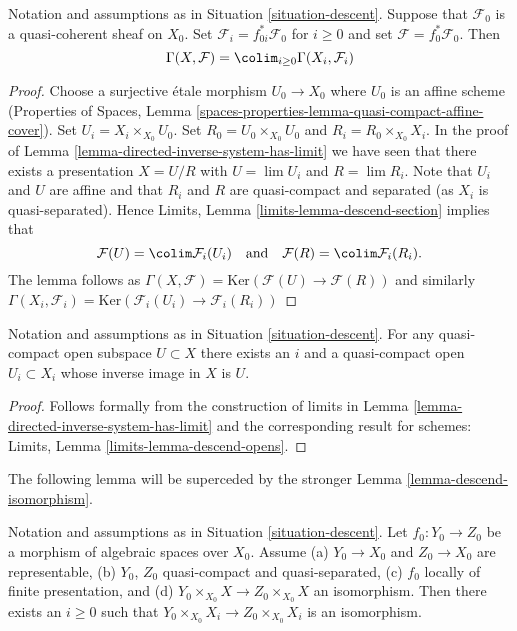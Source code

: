 \begin{lemma}
\label{lemma-descend-section}
Notation and assumptions as in Situation \ref{situation-descent}.
Suppose that $\mathcal{F}_0$ is a quasi-coherent sheaf on $X_0$.
Set $\mathcal{F}_i = f_{0i}^*\mathcal{F}_0$ for $i \geq 0$ and set
$\mathcal{F} = f_0^*\mathcal{F}_0$. Then
$$
\Gamma(X, \mathcal{F}) = \colim_{i \geq 0} \Gamma(X_i, \mathcal{F}_i)
$$
\end{lemma}

\begin{proof}
Choose a surjective \'etale morphism $U_0 \to X_0$ where $U_0$ is an affine
scheme (Properties of Spaces, Lemma
\ref{spaces-properties-lemma-quasi-compact-affine-cover}).
Set $U_i = X_i \times_{X_0} U_0$.
Set $R_0 = U_0 \times_{X_0} U_0$ and $R_i = R_0 \times_{X_0} X_i$.
In the proof of Lemma \ref{lemma-directed-inverse-system-has-limit} we have
seen that there exists a presentation $X = U/R$ with
$U = \lim U_i$ and $R = \lim R_i$.
Note that $U_i$ and $U$ are affine and that $R_i$ and $R$ are
quasi-compact and separated (as $X_i$ is quasi-separated). Hence
Limits, Lemma \ref{limits-lemma-descend-section}
implies that
$$
\mathcal{F}(U) = \colim \mathcal{F}_i(U_i)
\quad\text{and}\quad
\mathcal{F}(R) = \colim \mathcal{F}_i(R_i).
$$
The lemma follows as
$\Gamma(X, \mathcal{F}) = \text{Ker}(\mathcal{F}(U) \to \mathcal{F}(R))$
and similarly
$\Gamma(X_i, \mathcal{F}_i) =
\text{Ker}(\mathcal{F}_i(U_i) \to \mathcal{F}_i(R_i))$
\end{proof}

\begin{lemma}
\label{lemma-descend-opens}
Notation and assumptions as in Situation \ref{situation-descent}.
For any quasi-compact open subspace $U \subset X$ there exists an $i$
and a quasi-compact open $U_i \subset X_i$ whose inverse image in $X$ is $U$.
\end{lemma}

\begin{proof}
Follows formally from the construction of limits in
Lemma \ref{lemma-directed-inverse-system-has-limit}
and the corresponding result for schemes:
Limits, Lemma \ref{limits-lemma-descend-opens}.
\end{proof}

\noindent
The following lemma will be superceded by the stronger
Lemma \ref{lemma-descend-isomorphism}.

\begin{lemma}
\label{lemma-descend-equality}
Notation and assumptions as in Situation \ref{situation-descent}.
Let $f_0 : Y_0 \to Z_0$ be a morphism of algebraic spaces over $X_0$.
Assume (a) $Y_0 \to X_0$ and $Z_0 \to X_0$ are representable, (b)
$Y_0$, $Z_0$ quasi-compact and quasi-separated, (c)
$f_0$ locally of finite presentation, and
(d) $Y_0 \times_{X_0} X \to Z_0 \times_{X_0} X$ an isomorphism.
Then there exists an $i \geq 0$ such that
$Y_0 \times_{X_0} X_i \to Z_0 \times_{X_0} X_i$ is an isomorphism.
\end{lemma}

